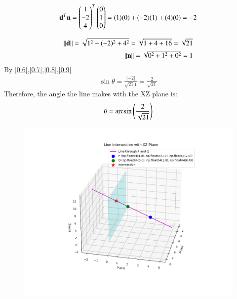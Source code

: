 \documentclass[journal]{IEEEtran}
\begin{document}
	\begin{align}
		\mathbf{d}^T\mathbf{n} = \begin{pmatrix}1 \\ -2 \\ 4\end{pmatrix}^T\begin{pmatrix}0 \\ 1 \\ 0\end{pmatrix} = (1)(0) + (-2)(1) + (4)(0) = -2 \label{0.7}
	\end{align}
	
	\begin{align}
		\left\lVert\mathbf{d}\right\rVert = \sqrt{1^2 + (-2)^2 + 4^2} = \sqrt{1 + 4 + 16} = \sqrt{21} \label{0.8} \\ 
		\left\lVert\mathbf{n}\right\rVert = \sqrt{0^2 + 1^2 + 0^2} = 1 \label{0.9}
	\end{align}
	By \eqref{0.6},\eqref{0.7},\eqref{0.8},\eqref{0.9}
	\begin{align}
		\sin\theta = \frac{|-2|}{\sqrt{21}1} = \frac{2}{\sqrt{21}}
	\end{align}
	Therefore, the angle the line makes with the XZ plane is:
	\begin{align}
		\theta = \arcsin\left(\frac{2}{\sqrt{21}}\right)
	\end{align}
	
	\begin{figure}[H]
		\centering
		\includegraphics[width = 0.8\columnwidth]{Figure_1.png}
		\caption*{}
		\label{}
	\end{figure}
	
\end{document}
